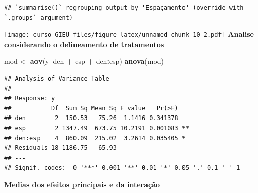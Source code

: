 \documentclass[
]{book}
\newenvironment{Shaded}{\begin{snugshade}}{\end{snugshade}}
\newcommand{\DataTypeTok}[1]{\textcolor[rgb]{0.13,0.29,0.53}{#1}}
\newcommand{\KeywordTok}[1]{\textcolor[rgb]{0.13,0.29,0.53}{\textbf{#1}}}
\newcommand{\NormalTok}[1]{#1}
\newcommand{\OperatorTok}[1]{\textcolor[rgb]{0.81,0.36,0.00}{\textbf{#1}}}
\newcommand{\StringTok}[1]{\textcolor[rgb]{0.31,0.60,0.02}{#1}}
\begin{document}
\begin{Shaded}
\end{Shaded}

\begin{verbatim}
## `summarise()` regrouping output by 'Espaçamento' (override with `.groups` argument)
\end{verbatim}

\texttt{[image: curso\_GIEU\_files/figure-latex/unnamed-chunk-10-2.pdf]}
\textbf{Analise considerando o delineamento de tratamentos}

\begin{Shaded}
\begin{Highlighting}[]
\NormalTok{mod <-}\StringTok{ }\KeywordTok{aov}\NormalTok{(y}\OperatorTok{~}\NormalTok{den }\OperatorTok{+}\StringTok{ }\NormalTok{esp }\OperatorTok{+}\StringTok{ }\NormalTok{den}\OperatorTok{:}\NormalTok{esp)}
\KeywordTok{anova}\NormalTok{(mod)}
\end{Highlighting}
\end{Shaded}

\begin{verbatim}
## Analysis of Variance Table
## 
## Response: y
##           Df  Sum Sq Mean Sq F value   Pr(>F)   
## den        2  150.53   75.26  1.1416 0.341378   
## esp        2 1347.49  673.75 10.2191 0.001083 **
## den:esp    4  860.09  215.02  3.2614 0.035405 * 
## Residuals 18 1186.75   65.93                    
## ---
## Signif. codes:  0 '***' 0.001 '**' 0.01 '*' 0.05 '.' 0.1 ' ' 1
\end{verbatim}

\textbf{Medias dos efeitos principais e da interação}
\end{document}
